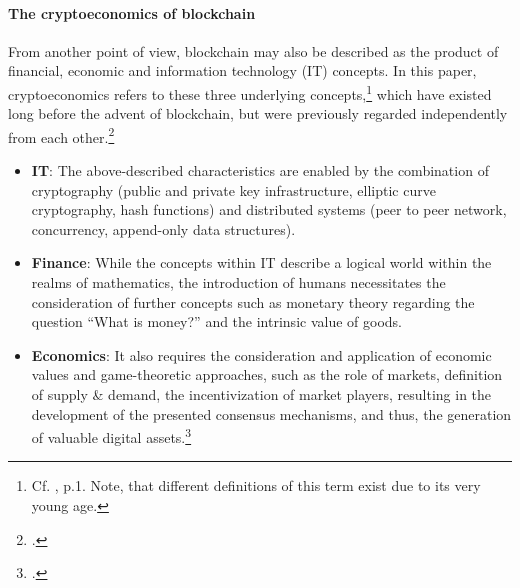 \paragraph{The cryptoeconomics of blockchain} From another point of view, blockchain may also be described as the product of financial, economic and information technology (IT) concepts. In this paper, cryptoeconomics refers to these three underlying concepts,\footnote{Cf. \cite{BabbittCryptoeconomicDesignProposed2015}, p.1. Note, that different definitions of this term exist due to its very young age.}  which have existed long before the advent of blockchain, but were previously regarded independently from each other.\footcites[Cf.][p.2]{DavidsonEconomicsBlockchain2016}[cf.][p.21]{AntonopolousAndreasM..2017}[cf.][p.110]{RabahDigitalCryptoeconomicsPowered2017}
\begin{itemize}[noitemsep]
    \item \textbf{IT}: The above-described characteristics are enabled by the combination of cryptography (public and private key infrastructure, elliptic curve cryptography, hash functions) and distributed systems (peer to peer network, concurrency, append-only data structures).
    \item \textbf{Finance}: While the concepts within IT describe a logical world within the realms of mathematics, the introduction of humans necessitates the consideration of further concepts such as monetary theory regarding the question \enquote{What is money?} and the intrinsic value of goods.
    \item \textbf{Economics}: It also requires the consideration and application of economic values and game-theoretic approaches, such as the role of markets, definition of supply \& demand, the incentivization of market players, resulting in the development of the presented consensus mechanisms, and thus, the generation of valuable digital assets.\footcite[Cf.][\textit{Cryptoeconomics}]{BashirMasteringBlockchainSecond2018}
\end{itemize}



